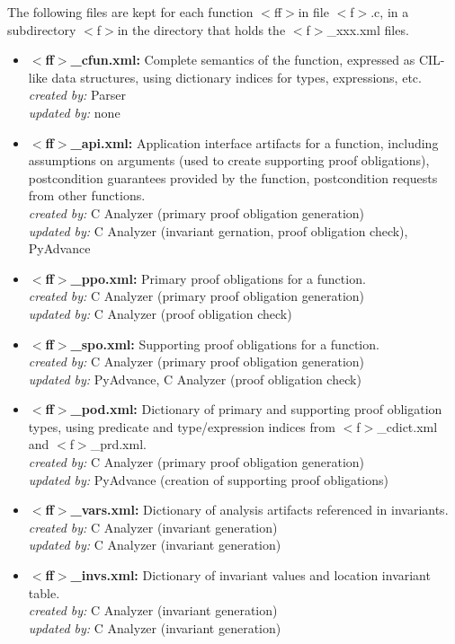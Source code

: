 \documentclass[11pt]{article}
\newcommand\fname{$<$f$>$}
\newcommand\fnname{$<$ff$>$}
\begin{document}
The following files are kept for each function \fnname in file \fname.c, 
in a subdirectory \fname in the directory that holds the \fname\_xxx.xml
files.

\begin{itemize}[leftmargin=*]
\item {\bf \fnname\_cfun.xml:} Complete semantics of the function, expressed
   as CIL-like data structures, using dictionary indices for types, expressions,
   etc.\\
   \emph{created by:} Parser \\
   \emph{updated by:} none
\item {\bf \fnname\_api.xml:} Application interface artifacts for a function,
  including assumptions on arguments (used to create supporting proof obligations),
  postcondition guarantees provided by the function, postcondition requests from
  other functions.\\
  \emph{created by:} C Analyzer (primary proof obligation generation) \\
  \emph{updated by:} C Analyzer (invariant gernation, proof obligation check), PyAdvance
\item {\bf \fnname\_ppo.xml:} Primary proof obligations for a function. \\
  \emph{created by:} C Analyzer (primary proof obligation generation) \\
  \emph{updated by:} C Analyzer (proof obligation check)
\item {\bf \fnname\_spo.xml:} Supporting proof obligations for a function. \\
  \emph{created by:} C Analyzer (primary proof obligation generation) \\
  \emph{updated by:} PyAdvance, C Analyzer (proof obligation check)
\item {\bf \fnname\_pod.xml:} Dictionary of primary and supporting proof obligation
   types, using predicate and type/expression indices from \fname\_cdict.xml and
   \fname\_prd.xml. \\
   \emph{created by:} C Analyzer (primary proof obligation generation) \\
   \emph{updated by:} PyAdvance (creation of supporting proof obligations)
\item {\bf \fnname\_vars.xml:} Dictionary of analysis artifacts referenced in invariants.\\
   \emph{created by:} C Analyzer (invariant generation) \\
   \emph{updated by:} C Analyzer (invariant generation)
\item {\bf \fnname\_invs.xml:} Dictionary of invariant values and location invariant table.\\
   \emph{created by:} C Analyzer (invariant generation) \\
   \emph{updated by:} C Analyzer (invariant generation)
\end{itemize}
\end{document}
